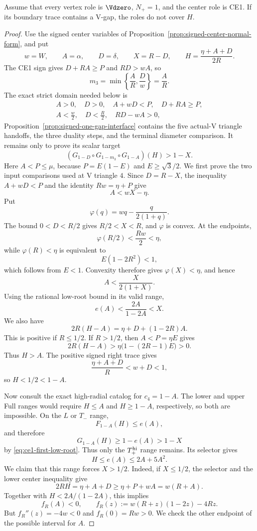 \begin{proposition}
\label{prop:ce1-one-gap}
Assume that every vertex role is $\Vdzero$, $N_+=1$, and the center role is
CE1.  If its boundary trace contains a V-gap, the roles do not cover $H$.
\end{proposition}

\begin{proof}
Use the signed center variables of
Proposition~\ref{prop:signed-center-normal-form}, and put
\[
 w=W,\qquad A=\alpha,\qquad D=\delta,\qquad
 X=R-D,\qquad H=\frac{\eta+A+D}{2R}.
\]
The CE1 sign gives
$D+RA\ge P$ and $RD>wA$, so
\[
 m_3=\min\left\{\frac AR,\frac Dw\right\}=\frac AR.
\]
The exact strict domain needed below is
\begin{equation}
\begin{gathered}
 A>0,\quad D>0,\quad A+wD<P,\quad D+RA\ge P,\\
 A<\frac w2,\quad D<\frac R2,\quad RD-wA>0,
\end{gathered}
\label{eq:ce1-normal-domain}
\end{equation}
Proposition~\ref{prop:signed-one-gap-interface} contains the five actual-V triangle
handoffs, the three duality steps, and the terminal diameter comparison.
It remains only to prove its scalar target
\begin{equation}
 \left(G_{1-D}\circ G_{1-m_3}\circ G_{1-A}\right)(H)>1-X.
 \label{eq:ce1-suffix}
\end{equation}
Here $A<P\le\mu$, because $P=E(1-E)$ and $E\ge\sqrt3/2$.  We first prove
the two input comparisons used at V triangle $4$.  Since $D=R-X$, the inequality
$A+wD<P$ and the identity $Rw=\eta+P$ give
\[
 A<wX-\eta.
\]
Put
\[
 \varphi(q)=wq-\frac{q}{2(1+q)}.
\]
The bound $0<D<R/2$ gives $R/2<X<R$, and $\varphi$ is convex.  At the
endpoints,
\[
 \varphi(R/2)<\frac{Rw}{2}<\eta,
\]
while $\varphi(R)<\eta$ is equivalent to
\[
 E(1-2R^2)<1,
\]
which follows from $E<1$.  Convexity therefore gives
$\varphi(X)<\eta$, and hence
\[
 A<\frac{X}{2(1+X)}.
\]
Using the rational low-root bound in its valid range,
\begin{equation}
 e(A)<\frac{2A}{1-2A}<X.
 \label{eq:ce1-first-low-root}
\end{equation}
We also have
\[
 2R(H-A)=\eta+D+(1-2R)A.
\]
This is positive if $R\le1/2$.  If $R>1/2$, then $A<P=\eta E$ gives
\[
 2R(H-A)>
 \eta\bigl(1-(2R-1)E\bigr)>0.
\]
Thus $H>A$.  The positive signed right trace gives
\[
 \frac{\eta+A+D}{R}<w+D<1,
\]
so $H<1/2<1-A$.

Now consult the exact high-radial catalog for $c_4=1-A$.  The lower and
upper Full ranges would require $H\le A$ and $H\ge1-A$, respectively, so
both are impossible.  On the $L$ or $T_-$ range,
\[
 F_{1-A}(H)\le e(A),
\]
and therefore
\[
 G_{1-A}(H)\ge1-e(A)>1-X
\]
by \eqref{eq:ce1-first-low-root}.  Thus only the
$T_+^{\rm hi}$ range remains.  Its selector gives
\[
 H\le e(A)\le2A+5A^2.
\]
We claim that this range forces $X>1/2$.  Indeed, if $X\le1/2$, the selector
and the lower center inequality give
\[
 2RH=\eta+A+D\ge\eta+P+wA=w(R+A).
\]
Together with $H<2A/(1-2A)$, this implies
\[
 f_R(A)<0,
 \qquad
 f_R(z):=w(R+z)(1-2z)-4Rz.
\]
But $f_R''(z)=-4w<0$ and $f_R(0)=Rw>0$.  We check the other endpoint of
the possible interval for $A$.


\end{proof}
